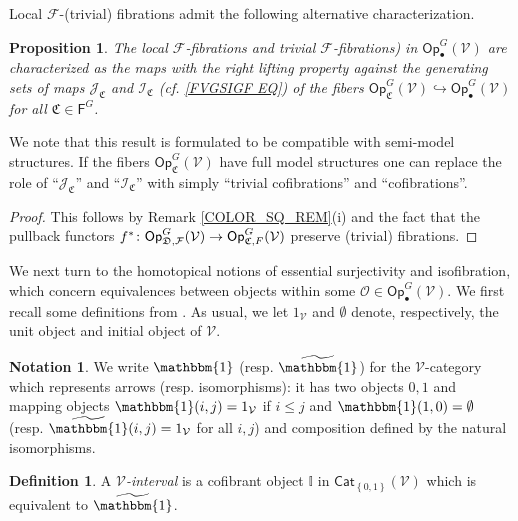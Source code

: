 \documentclass[a4paper,10pt
,draft
]{article}%
\numberwithin{equation}{section}
\numberwithin{figure}{section}
\newtheorem{proposition}[equation]{Proposition}%
\theoremstyle{definition} %
\newtheorem{definition}[equation]{Definition}%
\newtheorem{notation}[equation]{Notation}%
\newcommand{\set}[1]{\left\{#1\right\}}%
\newcommand{\Cat}{\mathsf{Cat}}
\newcommand{\F}{\ensuremath{\mathcal F}}
\newcommand{\V}{\ensuremath{\mathcal V}}
\renewcommand{\O}{\ensuremath{\mathcal O}}
\newcommand{\I}{\mathbb I}
\newcommand{\1}{\ensuremath{\mathbbm 1}}%
\begin{document}
Local $\F$-(trivial) fibrations admit the following alternative characterization.

\begin{proposition}\label{LOCALTCHAR PROP}
The local $\F$-fibrations
and trivial $\F$-fibrations)
in $\mathsf{Op}^G_\bullet(\V)$
are characterized as the maps with the right lifting property against the generating sets of maps 
$\mathcal{J}_{\mathfrak{C}}$ and $\mathcal{I}_{\mathfrak{C}}$
(cf. \eqref{FVGSIGF EQ})
of the fibers 
$\mathsf{Op}^G_{\mathfrak{C}}(\V) \hookrightarrow \mathsf{Op}^G_\bullet(\V)$
for all $\mathfrak{C} \in \mathsf{F}^G$.
\end{proposition}

We note that this result is formulated to be compatible with semi-model structures.
If the fibers $\mathsf{Op}^G_{\mathfrak{C}}(\V)$ have full model structures one can replace the role of
``$\mathcal{J}_{\mathfrak{C}}$'' and ``$\mathcal{I}_{\mathfrak{C}}$''
with simply ``trivial cofibrations'' and ``cofibrations''.


\begin{proof}
This follows by Remark \ref{COLOR_SQ_REM}(i)
and the fact that the pullback functors
$f^{\**} \colon \mathsf{Op}^G_{\mathfrak{D},\F}(\V)
\to \mathsf{Op}^G_{\mathfrak{C},F}(\V)$
preserve (trivial) fibrations.
\end{proof}




We next turn to the homotopical notions of essential surjectivity and isofibration, which concern equivalences between objects within some 
$\O \in \mathsf{Op}^G_\bullet(\V)$.
We first recall some definitions from \cite{BM13}.
As usual, we let $1_\V$ and $\emptyset$ denote, respectively, the unit object and initial object of $\V$.

\begin{notation}
We write $\mathbbm{1}$ (resp. $\widetilde{\mathbbm{1}}$)
for the $\V$-category which represents arrows (resp. isomorphisms):
it has two objects $0,1$
and mapping objects
$\mathbbm{1}(i,j)= 1_{\V}$
if $i \leq j$
and 
$\mathbbm{1}(1,0)= \emptyset$
(resp. $\widetilde{\mathbbm{1}}(i,j)= 1_{\V}$ for all $i,j$)
and composition defined by the natural isomorphisms.
\end{notation}


\begin{definition}
	A {\em $\V$-interval} is a cofibrant object $\I$ in $\Cat_{\set{0,1}}(\V)$
	which is equivalent to $\widetilde{\mathbbm{1}}$.
\end{definition}
\end{document}
